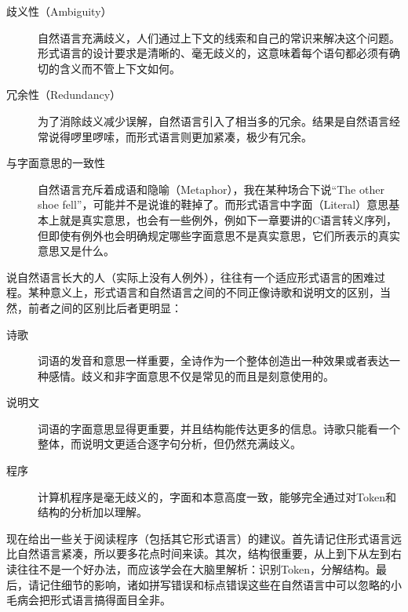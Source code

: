 \begin{description}
\item[{歧义性（Ambiguity）}]


自然语言充满歧义，人们通过上下文的线索和自己的常识来解决这个问题。形式语言的设计要求是清晰的、毫无歧义的，这意味着每个语句都必须有确切的含义而不管上下文如何。

\item[{冗余性（Redundancy）}]


为了消除歧义减少误解，自然语言引入了相当多的冗余。结果是自然语言经常说得啰里啰嗦，而形式语言则更加紧凑，极少有冗余。

\item[{与字面意思的一致性}]


自然语言充斥着成语和隐喻（Metaphor），我在某种场合下说“The other shoe fell”，可能并不是说谁的鞋掉了。而形式语言中字面（Literal）意思基本上就是真实意思，也会有一些例外，例如下一章要讲的C语言转义序列，但即使有例外也会明确规定哪些字面意思不是真实意思，它们所表示的真实意思又是什么。


\end{description}


说自然语言长大的人（实际上没有人例外），往往有一个适应形式语言的困难过程。某种意义上，形式语言和自然语言之间的不同正像诗歌和说明文的区别，当然，前者之间的区别比后者更明显：


\begin{description}
\item[{诗歌}]


词语的发音和意思一样重要，全诗作为一个整体创造出一种效果或者表达一种感情。歧义和非字面意思不仅是常见的而且是刻意使用的。

\item[{说明文}]


词语的字面意思显得更重要，并且结构能传达更多的信息。诗歌只能看一个整体，而说明文更适合逐字句分析，但仍然充满歧义。

\item[{程序}]


计算机程序是毫无歧义的，字面和本意高度一致，能够完全通过对Token和结构的分析加以理解。


\end{description}


现在给出一些关于阅读程序（包括其它形式语言）的建议。首先请记住形式语言远比自然语言紧凑，所以要多花点时间来读。其次，结构很重要，从上到下从左到右读往往不是一个好办法，而应该学会在大脑里解析：识别Token，分解结构。最后，请记住细节的影响，诸如拼写错误和标点错误这些在自然语言中可以忽略的小毛病会把形式语言搞得面目全非。

